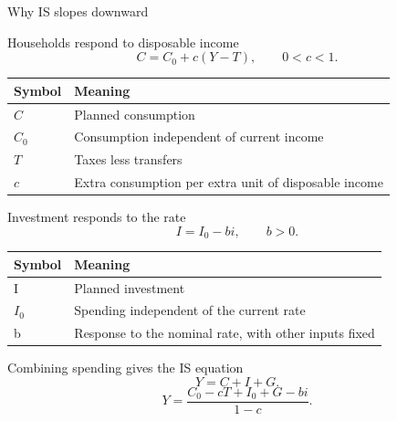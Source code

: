 \documentclass[12pt,aspectratio=169]{beamer}
\renewcommand{\nominal}{i}
\begin{document}

\begin{frame}{Why IS slopes downward}
\end{frame}


\begin{frame}{Households respond to disposable income}
\[C=C_0+c(Y-T),\qquad 0<c<1.\]\begin{center}\begin{tabular}{@{}ll@{}}\toprule \textbf{Symbol} & \textbf{Meaning}\\\midrule $C$ & Planned consumption\\[2mm]
$C_0$ & Consumption independent of current income\\[2mm]
$T$ & Taxes less transfers\\[2mm]
$c$ & Extra consumption per extra unit of disposable income\\\bottomrule\end{tabular}\end{center}
\end{frame}


\begin{frame}{Investment responds to the rate}
\[I=I_0-bi,\qquad b>0.\]\begin{center}\begin{tabular}{@{}ll@{}}\toprule \textbf{Symbol} & \textbf{Meaning}\\\midrule I & Planned investment\\[2mm]
$I_0$ & Spending independent of the current rate\\[2mm]
b & Response to the nominal rate, with other inputs fixed\\\bottomrule\end{tabular}\end{center}
\end{frame}


\begin{frame}{Combining spending gives the IS equation}
\[Y=C+I+G.\]\[\boxed{Y=\frac{C_0-cT+I_0+G-b\nominal}{1-c}.}\]
\end{frame}
\end{document}
